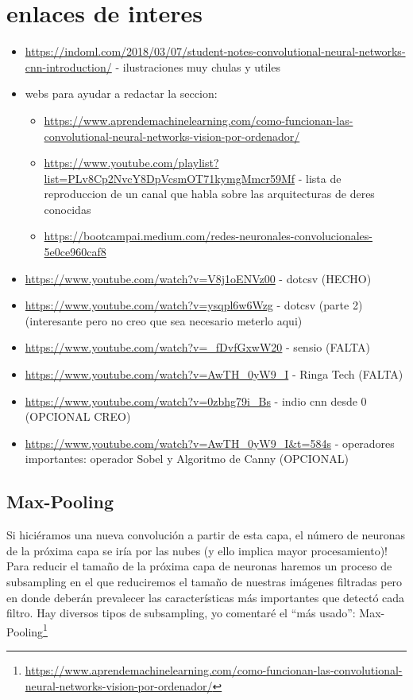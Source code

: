 \documentclass{article}
\begin{document}
\section{enlaces de interes}
\begin{itemize}
\item \url{https://indoml.com/2018/03/07/student-notes-convolutional-neural-networks-cnn-introduction/} - ilustraciones muy chulas y utiles

\item webs para ayudar a redactar la seccion:
\begin{itemize}
\item \url{https://www.aprendemachinelearning.com/como-funcionan-las-convolutional-neural-networks-vision-por-ordenador/}
\item \url{https://www.youtube.com/playlist?list=PLv8Cp2NvcY8DpVcsmOT71kymgMmcr59Mf} - lista de reproduccion de un canal que habla sobre las arquitecturas de deres conocidas
\item \url{https://bootcampai.medium.com/redes-neuronales-convolucionales-5e0ce960caf8}
\end{itemize}
\item \url{https://www.youtube.com/watch?v=V8j1oENVz00} - dotcsv (HECHO)
\item \url{https://www.youtube.com/watch?v=ysqpl6w6Wzg} - dotcsv (parte 2) (interesante pero no creo que sea necesario meterlo aqui)
\item \url{https://www.youtube.com/watch?v=_fDvfGxwW20} - sensio (FALTA)
\item \url{https://www.youtube.com/watch?v=AwTH_0yW9_I} - Ringa Tech (FALTA)
\item \url{https://www.youtube.com/watch?v=0zbhg79i_Bs} - indio cnn desde 0 (OPCIONAL CREO)
\item \url{https://www.youtube.com/watch?v=AwTH_0yW9_I&t=584s} - operadores importantes: operador Sobel y Algoritmo de Canny (OPCIONAL)
\end{itemize}



\subsection{Max-Pooling}
Si hiciéramos una nueva convolución a partir de esta capa, el número de neuronas de la próxima capa se iría por las nubes (y ello implica mayor procesamiento)! Para reducir el tamaño de la próxima capa de neuronas haremos un proceso de subsampling en el que reduciremos el tamaño de nuestras imágenes filtradas pero en donde deberán prevalecer las características más importantes que detectó cada filtro. Hay diversos tipos de subsampling, yo comentaré el “más usado”: Max-Pooling\footnote{\url{https://www.aprendemachinelearning.com/como-funcionan-las-convolutional-neural-networks-vision-por-ordenador/}}\\
\end{document}

